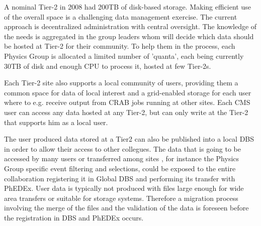 A nominal Tier-2 in 2008 had 200TB of disk-based storage.
Making efficient use of the overall space is a challenging data management exercise.
The current approach is decentralized administration with central oversight.
The knowledge of the needs is aggregated in the group leaders whom will decide which data should be hosted at Tier-2 for their community. To help
them in the process, each Physics Group is allocated a limited number 
of 'quanta', each being currently 30TB of disk and enough CPU to process it, hosted at few Tier-2s. 

Each Tier-2 site also supports a local community of users, providing them
a common space for data of local interest and a grid-enabled
storage for each user where to e.g. receive output from CRAB jobs
running at other sites. Each CMS user can access any data
hosted at any Tier-2, but can only write at the Tier-2 that supports him
as a local user.

The user produced data stored at a Tier2 can also be published into a local DBS
in order to allow their access to other collegues.
The data that is going to be accessed by many users or transferred among sites %
, for instance the Physics Group specific event filtering and selections,
could be exposed to the entire collaboration registering it in Global DBS and performing its transfer with PhEDEx.
User data is typically not produced with files large enough for wide area transfers or suitable for storage systems. Therefore a migration process involving the merge of the files and the validation of the data is foreseen before the registration in DBS and PhEDEx occurs. 

